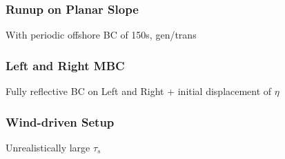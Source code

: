 \documentclass[aspectratio=169]{beamer}
\begin{document}
\begin{frame}
  \frametitle{Runup on Planar Slope}
  With periodic offshore BC of 150s, gen/trans
  \centering
\end{frame}
\begin{frame}
  \frametitle{Left and Right MBC}
  Fully reflective BC on Left and Right + initial displacement of $\eta$
    \centering
\end{frame}
\begin{frame}
  \frametitle{Wind-driven Setup}
  Unrealistically large $\tau_s$
    \centering
\end{frame}
\end{document}
